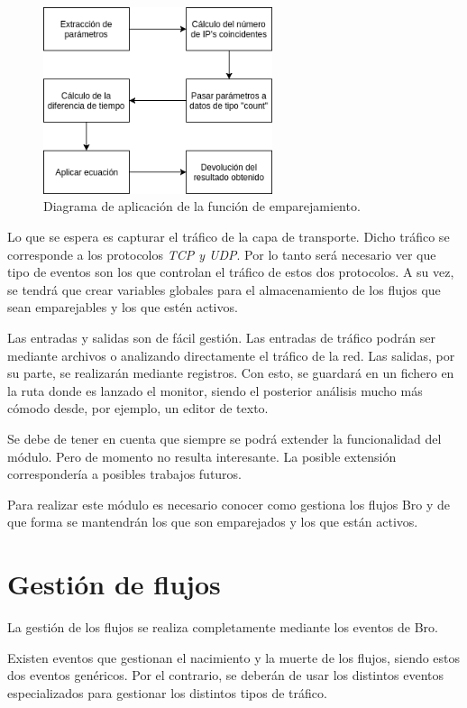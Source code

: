 \begin{figure}[H]
  \includegraphics[width=0.6\textwidth]{imagenes/emparejamiento.png}
  \centering
  \caption{Diagrama de aplicación de la función de emparejamiento.}\label{fig.emparejamiento}
\end{figure}


\intro Lo que se espera es capturar el tráfico de la capa de transporte. Dicho tráfico se corresponde a los 
protocolos \textit{TCP y UDP}. Por lo tanto será necesario ver que tipo de eventos son los que controlan el tráfico 
de estos dos protocolos. A su vez, se tendrá que crear variables globales para el almacenamiento de los flujos que sean emparejables 
y los que estén activos.

\intro Las entradas y salidas son de fácil gestión. Las entradas de tráfico podrán ser mediante archivos o 
analizando directamente el tráfico de la red. Las salidas, por su parte, se realizarán mediante registros. Con esto, se guardará en un fichero en la ruta donde es lanzado el monitor, siendo el posterior análisis mucho más cómodo desde, por ejemplo, un editor de texto.

\intro Se debe de tener en cuenta que siempre se podrá extender la funcionalidad del módulo. Pero de momento no 
resulta interesante. La posible extensión correspondería a posibles trabajos futuros.

\intro Para realizar este módulo es necesario conocer como gestiona los flujos Bro y de que forma se mantendrán 
los que son emparejados y los que están activos.

\section{Gestión de flujos}

La gestión de los flujos se realiza completamente mediante los eventos de Bro.

\intro Existen eventos que gestionan el nacimiento y la muerte de los flujos, siendo estos dos eventos genéricos. Por el contrario, 
se deberán de usar los distintos eventos especializados para gestionar los distintos tipos de tráfico.

